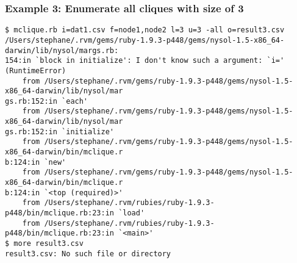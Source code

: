 \subsubsection*{Example 3: Enumerate all cliques with size of 3}



\begin{Verbatim}[baselinestretch=0.7,frame=single]
$ mclique.rb i=dat1.csv f=node1,node2 l=3 u=3 -all o=result3.csv
/Users/stephane/.rvm/gems/ruby-1.9.3-p448/gems/nysol-1.5-x86_64-darwin/lib/nysol/margs.rb:
154:in `block in initialize': I don't know such a argument: `i=' (RuntimeError)
	from /Users/stephane/.rvm/gems/ruby-1.9.3-p448/gems/nysol-1.5-x86_64-darwin/lib/nysol/mar
gs.rb:152:in `each'
	from /Users/stephane/.rvm/gems/ruby-1.9.3-p448/gems/nysol-1.5-x86_64-darwin/lib/nysol/mar
gs.rb:152:in `initialize'
	from /Users/stephane/.rvm/gems/ruby-1.9.3-p448/gems/nysol-1.5-x86_64-darwin/bin/mclique.r
b:124:in `new'
	from /Users/stephane/.rvm/gems/ruby-1.9.3-p448/gems/nysol-1.5-x86_64-darwin/bin/mclique.r
b:124:in `<top (required)>'
	from /Users/stephane/.rvm/rubies/ruby-1.9.3-p448/bin/mclique.rb:23:in `load'
	from /Users/stephane/.rvm/rubies/ruby-1.9.3-p448/bin/mclique.rb:23:in `<main>'
$ more result3.csv
result3.csv: No such file or directory
\end{Verbatim}
